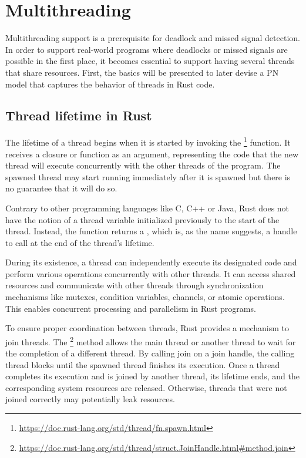 \section{Multithreading}

Multithreading support is a prerequisite for deadlock and missed signal detection.
In order to support real-world programs
where deadlocks or missed signals are possible in the first place,
it becomes essential to support having several threads that share resources.
First, the basics will be presented to later devise a \acrshort{PN} model that captures
the behavior of threads in Rust code.

\subsection{Thread lifetime in Rust}

The lifetime of a thread begins when it is started by invoking the
\footnote{\url{https://doc.rust-lang.org/std/thread/fn.spawn.html}}
function.
It receives a closure or function as an argument,
representing the code that the new thread will execute concurrently
with the other threads of the program.
The spawned thread may start running immediately after it is spawned
but there is no guarantee that it will do so.

Contrary to other programming languages like C, C++ or Java,
Rust does not have the notion of a thread variable
initialized previously to the start of the thread.
Instead, the function  returns
a ,
which is, as the name suggests, a handle to call 
at the end of the thread's lifetime.

During its existence, a thread can independently execute its designated code
and perform various operations concurrently with other threads.
It can access shared resources and communicate with other threads
through synchronization mechanisms like
mutexes, condition variables, channels, or atomic operations.
This enables concurrent processing and parallelism in Rust programs.

To ensure proper coordination between threads,
Rust provides a mechanism to join threads.
The \footnote{\url{https://doc.rust-lang.org/std/thread/struct.JoinHandle.html\#method.join}} method
allows the main thread or another thread
to wait for the completion of a different thread.
By calling join on a join handle,
the calling thread blocks until the spawned thread finishes its execution.
Once a thread completes its execution and is joined by another thread,
its lifetime ends, and the corresponding system resources are released.
Otherwise, threads that were not joined correctly may potentially leak resources.

